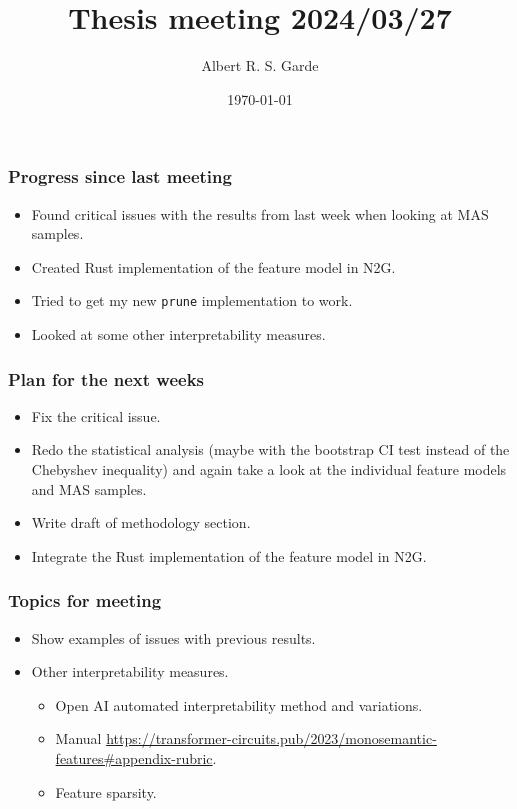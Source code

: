 \documentclass[aspectratio=169]{beamer}
\title{Thesis meeting 2024/03/27}
\author{Albert R. S. Garde}
\date{\today}
\begin{document}
\frame{
	\maketitle
}

\begin{frame}[fragile=singleslide]
	\frametitle{Progress since last meeting}
    \begin{itemize}
        \item Found critical issues with the results from last week when looking at MAS samples.
        \item Created Rust implementation of the feature model in N2G.
        \item Tried to get my new \texttt{prune} implementation to work.
        \item Looked at some other interpretability measures.
    \end{itemize}
\end{frame}
\begin{frame}[fragile=singleslide]
    \frametitle{Plan for the next weeks}
    \begin{itemize}
        \item Fix the critical issue.
        \item Redo the statistical analysis 
        (maybe with the bootstrap CI test instead of the Chebyshev inequality) 
        and again take a look at the individual feature models and MAS samples.
        \item Write draft of methodology section.
        \item Integrate the Rust implementation of the feature model in N2G.
    \end{itemize}
\end{frame}
\begin{frame}[fragile=singleslide]
    \frametitle{Topics for meeting}
    \begin{itemize}
        \item Show examples of issues with previous results.
        \item Other interpretability measures.
        \begin{itemize}
            \item Open AI automated interpretability method and variations.
            \item Manual \url{https://transformer-circuits.pub/2023/monosemantic-features#appendix-rubric}.
            \item Feature sparsity.
        \end{itemize}
    \end{itemize}
\end{frame}
\end{document}
